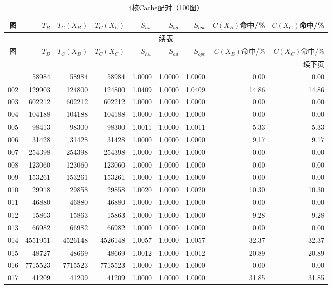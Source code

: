 \begin{longtable}{crrrrrrrr}
\caption{4核Cache配对（100图）}\label{tab:cache-detail-4}\\
\toprule
图 & $T_B$ & $T_C(X_B)$ & $T_C(X_C)$ & $S_{hw}$ & $S_{ad}$ & $S_{opt}$ & $C(X_B)$命中/\% & $C(X_C)$命中/\% \\
\midrule
\endfirsthead
\multicolumn{9}{c}{续表}\\
\toprule
图 & $T_B$ & $T_C(X_B)$ & $T_C(X_C)$ & $S_{hw}$ & $S_{ad}$ & $S_{opt}$ & $C(X_B)$命中/\% & $C(X_C)$命中/\% \\
\midrule
\endhead
\midrule\multicolumn{9}{r}{续下页}\\
\endfoot
\bottomrule
\endlastfoot
001 & 58984 & 58984 & 58984 & 1.0000 & 1.0000 & 1.0000 & 0.00 & 0.00 \\
002 & 129903 & 124800 & 124800 & 1.0409 & 1.0000 & 1.0409 & 14.86 & 14.86 \\
003 & 602212 & 602212 & 602212 & 1.0000 & 1.0000 & 1.0000 & 0.00 & 0.00 \\
004 & 104188 & 104188 & 104188 & 1.0000 & 1.0000 & 1.0000 & 0.00 & 0.00 \\
005 & 98413 & 98300 & 98300 & 1.0011 & 1.0000 & 1.0011 & 5.33 & 5.33 \\
006 & 31428 & 31428 & 31428 & 1.0000 & 1.0000 & 1.0000 & 9.17 & 9.17 \\
007 & 254398 & 254398 & 254398 & 1.0000 & 1.0000 & 1.0000 & 0.00 & 0.00 \\
008 & 123060 & 123060 & 123060 & 1.0000 & 1.0000 & 1.0000 & 0.00 & 0.00 \\
009 & 153261 & 153261 & 153261 & 1.0000 & 1.0000 & 1.0000 & 0.00 & 0.00 \\
010 & 29918 & 29858 & 29858 & 1.0020 & 1.0000 & 1.0020 & 10.30 & 10.30 \\
011 & 46880 & 46880 & 46880 & 1.0000 & 1.0000 & 1.0000 & 0.00 & 0.00 \\
012 & 15863 & 15863 & 15863 & 1.0000 & 1.0000 & 1.0000 & 9.28 & 9.28 \\
013 & 66982 & 66982 & 66982 & 1.0000 & 1.0000 & 1.0000 & 0.00 & 0.00 \\
014 & 4551951 & 4526148 & 4526148 & 1.0057 & 1.0000 & 1.0057 & 32.37 & 32.37 \\
015 & 48727 & 48669 & 48669 & 1.0012 & 1.0000 & 1.0012 & 20.89 & 20.89 \\
016 & 7715523 & 7715523 & 7715523 & 1.0000 & 1.0000 & 1.0000 & 0.00 & 0.00 \\
017 & 41209 & 41209 & 41209 & 1.0000 & 1.0000 & 1.0000 & 31.85 & 31.85 \\

\end{longtable}
